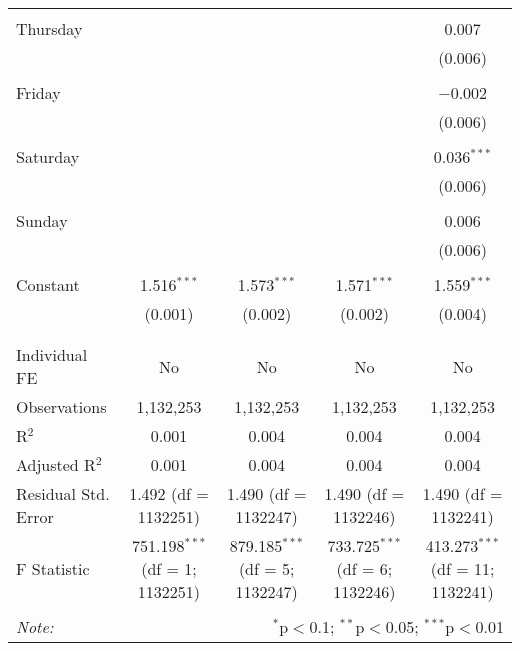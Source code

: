 \documentclass[
]{article}
\begin{document}
\begin{table}[!htbp]
{\begin{tabular}{@{\extracolsep{5pt}}lcccc}
  & & & & \\ 
 Thursday &  &  &  & 0.007 \\ 
  &  &  &  & (0.006) \\ 
  & & & & \\ 
 Friday &  &  &  & $-$0.002 \\ 
  &  &  &  & (0.006) \\ 
  & & & & \\ 
 Saturday &  &  &  & 0.036$^{***}$ \\ 
  &  &  &  & (0.006) \\ 
  & & & & \\ 
 Sunday &  &  &  & 0.006 \\ 
  &  &  &  & (0.006) \\ 
  & & & & \\ 
 Constant & 1.516$^{***}$ & 1.573$^{***}$ & 1.571$^{***}$ & 1.559$^{***}$ \\ 
  & (0.001) & (0.002) & (0.002) & (0.004) \\ 
  & & & & \\ 
\hline \\[-1.8ex] 
Individual FE & No & No & No & No \\ 
Observations & 1,132,253 & 1,132,253 & 1,132,253 & 1,132,253 \\ 
R$^{2}$ & 0.001 & 0.004 & 0.004 & 0.004 \\ 
Adjusted R$^{2}$ & 0.001 & 0.004 & 0.004 & 0.004 \\ 
Residual Std. Error & 1.492 (df = 1132251) & 1.490 (df = 1132247) & 1.490 (df = 1132246) & 1.490 (df = 1132241) \\ 
F Statistic & 751.198$^{***}$ (df = 1; 1132251) & 879.185$^{***}$ (df = 5; 1132247) & 733.725$^{***}$ (df = 6; 1132246) & 413.273$^{***}$ (df = 11; 1132241) \\ 
\hline 
\hline \\[-1.8ex] 
\textit{Note:}  & \multicolumn{4}{r}{$^{*}$p$<$0.1; $^{**}$p$<$0.05; $^{***}$p$<$0.01} \\ 
\end{tabular}
} 
\end{table} 
\newpage
\end{document}
